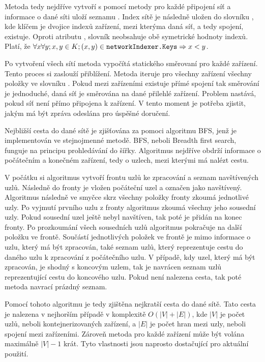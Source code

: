 Metoda tedy nejdříve vytvoří s pomocí metody  pro každé připojení síť a informace o dané síti uloží seznamu . Index sítě je následně uložen do slovníku , kde klíčem je dvojice indexů zařízení, mezi kterýma daná síť, a tedy spojení, existuje. Oproti atributu , slovník neobsahuje obě symetrické hodnoty indexů. Platí, že $\forall x \forall y; x,y\in K; (x,y) \in \texttt{networkIndexer.Keys} \Rightarrow x < y$. 

Po vytvoření všech sítí metoda vypočítá statického směrovaní pro každé zařízení. Tento proces si zaslouží přiblížení. Metoda iteruje pro všechny zařízení všechny položky ve slovníku . Pokud mezi zařízeními existuje přímé spojení tak směrování je jednoduché, daná síť je směrována na dané přilehlé zařízení. Problem nastává, pokud síť není přímo připojena k zařízení. V tento moment je potřeba zjistit, jakým  má být zpráva odeslána pro úspěšné doručení.

Nejbližší cesta do dané sítě je zjišťována za pomoci algoritmu BFS, jenž je implementován ve stejnojmenné metodě. BFS, neboli Breadth first search, funguje na principu prohledávání do šířky. Algoritmus nejdříve obdrží informace o počátečním a konečném zařízení, tedy o uzlech, mezi kterými má nalézt cestu. 

V počátku si algoritmus vytvoří frontu uzlů ke zpracování a seznam navštívených uzlů. Následně do fronty je vložen počáteční uzel a označen jako navštívený. Algoritmus následně ve smyčce skrz všechny položky fronty zkoumá jednotlivé uzly. Po vyjmutí prvního uzlu z fronty algoritmus zkoumá všechny jeho sousední uzly. Pokud sousední uzel ještě nebyl navštíven, tak poté je přidán na konec fronty. Po prozkoumání všech sousedních uzlů algoritmus pokračuje na další položku ve frontě. Součástí jednotlivých položek ve frontě je mimo informace o uzlu, který má být zpracován, také seznam uzlů, který reprezentuje cestu do daného uzlu k zpracování z počátečního uzlu. V případě, kdy uzel, který má být zpracován, je shodný s koncovým uzlem, tak je navrácen seznam uzlů reprezentující cestu do koncového uzlu. Pokud není nalezena cesta, tak poté metoda navrací prázdný seznam.

Pomocí tohoto algoritmu je tedy zjištěna nejkratší cesta do dané sítě. Tato cesta je nalezena v nejhorším případě v komplexitě $O(|V| + |E|)$, kde $|V|$ je počet uzlů, neboli kontejnerizovaných zařízení, a $|E|$ je počet hran mezi uzly, neboli spojení mezi zařízeními. Zároveň metoda pro každé zařízení může být volána maximálně $|V| - 1$ krát. Tyto vlastnosti jsou naprosto dostačující pro aktuální použití.

